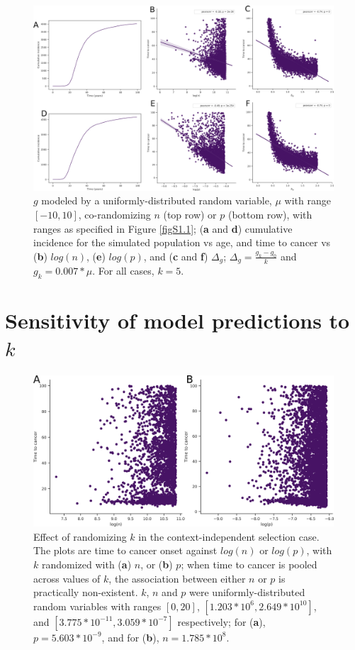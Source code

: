 \documentclass[12pt,onecolumn,twoside]{article}
\begin{document}
		\begin{figure}[tbhp]
			\centering
			\includegraphics[width=\linewidth, keepaspectratio=true]{figS1-2.png}
			\caption{$g$ modeled by a uniformly-distributed random variable, $\mu$ with range $[-10, 10]$, co-randomizing $n$ (top row) or $p$ (bottom row), with ranges as specified in Figure \ref{figS1.1}; (\textbf{a} and \textbf{d}) cumulative incidence for the simulated population vs age, and time to cancer vs (\textbf{b}) $log(n)$, (\textbf{e}) $log(p)$, and (\textbf{c} and \textbf{f}) $\Delta_{g}$; $\Delta_{g} = \frac{g_{k}-g_{0}}{k}$ and $g_{k} = 0.007*\mu$. For all cases, $k=5$.}
			\label{figS1.2}
		\end{figure}

	\section{Sensitivity of model predictions to $k$}\label{S2 Text}
		\renewcommand{\thefigure}{S2.\arabic{figure}}
		\setcounter{figure}{0}
		\begin{figure}[tbhp]
			\centering
			\includegraphics[width=\linewidth, keepaspectratio=true]{figS2-1.png}
			\caption{Effect of randomizing $k$ in the context-independent selection case. The plots are time to cancer onset against $log(n)$ or $log(p)$, with $k$ randomized with (\textbf{a}) $n$, or (\textbf{b}) $p$; when time to cancer is pooled across values of $k$, the association between either $n$ or $p$ is practically non-existent. $k$, $n$ and $p$ were uniformly-distributed random variables with ranges $[0, 20]$, $[1.203*10^{6}, 2.649*10^{10}]$, and $[3.775*10^{-11}, 3.059*10^{-7}]$ respectively; for (\textbf{a}), $p=5.603*10^{-9}$, and for (\textbf{b}), $n=1.785*10^{8}$.}
			\label{figS2.1}
		\end{figure}
\end{document}
